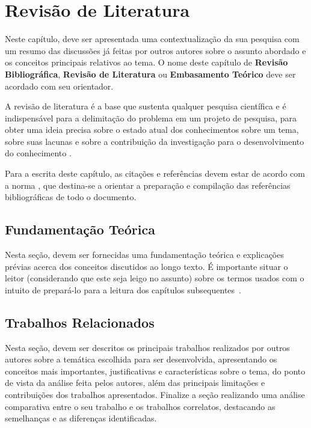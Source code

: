 \chapter{Revisão de Literatura} \label{RevisaoBibliografica}

Neste capítulo, deve ser apresentada uma contextualização da sua pesquisa com um resumo das discussões já feitas por outros autores sobre o assunto abordado e os conceitos principais relativos ao tema. O nome deste capítulo  de \textbf{Revisão Bibliográfica}, \textbf{Revisão de Literatura} ou \textbf{Embasamento Teórico} deve ser acordado com seu orientador.

A revisão de literatura é a base que sustenta qualquer pesquisa científica e é indispensável para a delimitação do problema em um projeto de pesquisa,  para obter uma ideia precisa sobre o estado atual dos conhecimentos sobre um tema, sobre suas lacunas e sobre a contribuição da investigação para o desenvolvimento do conhecimento \cite{marconi2003}. 

Para a escrita deste capítulo, as citações e referências devem estar de acordo com a norma \cite{NBR6023:2002}, que destina-se a orientar a preparação e compilação das  referências bibliográficas de todo o documento.

\section{Fundamentação Teórica}

Nesta seção, devem ser fornecidas uma fundamentação teórica e explicações prévias acerca dos conceitos discutidos ao longo texto. É importante situar o leitor (considerando que este seja leigo no assunto) sobre os termos usados com o intuito de prepará-lo para a leitura dos capítulos subsequentes~\cite{Rampazzo2005,Carvalho1989}.

\section{Trabalhos Relacionados}

Nesta seção, devem ser descritos os principais trabalhos realizados por outros autores sobre a temática escolhida para ser desenvolvida, apresentando os conceitos mais importantes, justificativas e características sobre o tema, do ponto de vista da análise feita pelos autores, além das principais limitações e contribuições dos trabalhos apresentados.  Finalize a seção realizando uma análise comparativa entre o seu trabalho e os trabalhos correlatos, destacando as semelhanças e as diferenças identificadas.








